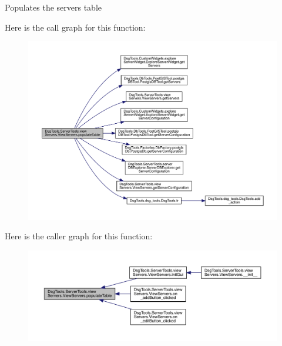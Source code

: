 \begin{DoxyVerb}Populates the servers table
\end{DoxyVerb}
 Here is the call graph for this function\+:
\nopagebreak
\begin{figure}[H]
\begin{center}
\leavevmode
\includegraphics[width=350pt]{class_dsg_tools_1_1_server_tools_1_1view_servers_1_1_view_servers_a4d8ffeccd0a84daebc1d311d028ae7cb_cgraph}
\end{center}
\end{figure}
Here is the caller graph for this function\+:
\nopagebreak
\begin{figure}[H]
\begin{center}
\leavevmode
\includegraphics[width=350pt]{class_dsg_tools_1_1_server_tools_1_1view_servers_1_1_view_servers_a4d8ffeccd0a84daebc1d311d028ae7cb_icgraph}
\end{center}
\end{figure}
\mbox{\label{class_dsg_tools_1_1_server_tools_1_1view_servers_1_1_view_servers_ac1337507461537612e927a8171c3afef}} 
